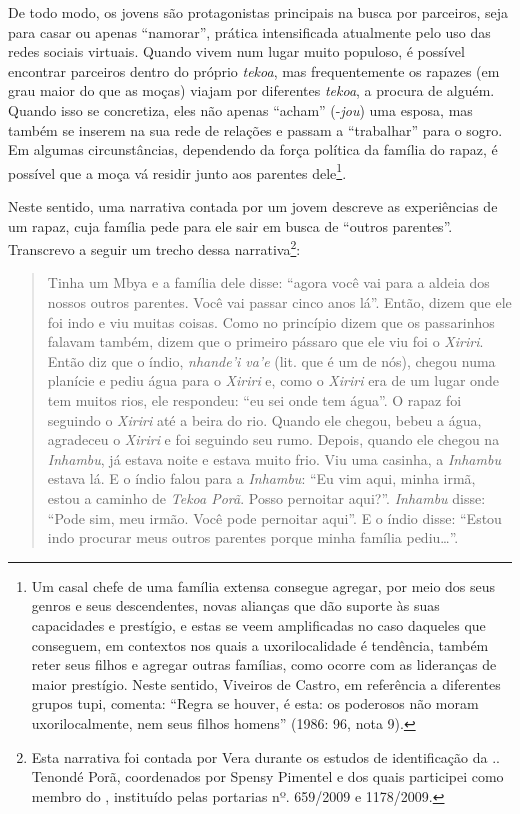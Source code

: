 De todo modo, os jovens são protagonistas principais na busca por
parceiros, seja para casar ou apenas ``namorar'', prática intensificada
atualmente pelo uso das redes sociais virtuais. Quando vivem num lugar
muito populoso, é possível encontrar parceiros dentro do próprio \emph{tekoa},
mas frequentemente os rapazes (em grau maior do que as moças) viajam
por diferentes \emph{tekoa}, a procura de alguém. Quando isso se concretiza,
eles não apenas ``acham'' (-\emph{jou}) uma esposa, mas também se inserem na sua
rede de relações e passam a ``trabalhar'' para o sogro. Em algumas
circunstâncias, dependendo da força política da família do rapaz, é
possível que a moça vá residir junto aos parentes dele\footnote{Um
casal chefe de uma família extensa consegue agregar, por meio dos seus
genros e seus descendentes, novas alianças que dão suporte às suas
capacidades e prestígio, e estas se veem amplificadas no caso daqueles
que conseguem, em contextos nos quais a uxorilocalidade é tendência,
também reter seus filhos e agregar outras famílias, como ocorre com as
lideranças de maior prestígio. Neste sentido, Viveiros de Castro, em
referência a diferentes grupos tupi, comenta: ``Regra se houver, é esta:
os poderosos não moram uxorilocalmente, nem seus filhos homens'' (1986:
96, nota 9).}. 

Neste sentido, uma narrativa contada por um jovem descreve as
experiências de um rapaz, cuja família pede para ele sair em busca de
``outros parentes''. Transcrevo a seguir um trecho dessa
narrativa\footnote{Esta narrativa foi contada por Vera durante os
estudos de identificação da .. Tenondé Porã, coordenados por Spensy
Pimentel e dos quais participei como membro do , instituído pelas
portarias nº. 659/2009 e 1178/2009.}: 

\begin{quotation}
Tinha um Mbya e a família dele disse: ``agora você vai para a aldeia dos
nossos outros parentes. Você vai passar cinco anos lá''. Então, dizem
que ele foi indo e viu muitas coisas. Como no princípio dizem que os
passarinhos falavam também, dizem que o primeiro pássaro que ele viu
foi o \emph{Xiriri}. Então diz que o índio, \emph{nhande’i va’e} (lit. que é um de
nós), chegou numa planície e pediu água para o \emph{Xiriri} e, como o \emph{Xiriri}
era de um lugar onde tem muitos rios, ele respondeu: ``eu sei onde tem
água''. O rapaz foi seguindo o \emph{Xiriri} até a beira do rio. Quando ele
chegou, bebeu a água, agradeceu o \emph{Xiriri} e foi seguindo seu rumo.
Depois, quando ele chegou na \emph{Inhambu}, já estava noite e estava muito
frio. Viu uma casinha, a \emph{Inhambu} estava lá. E o índio falou para a
\emph{Inhambu}: ``Eu vim aqui, minha irmã, estou a caminho de \emph{Tekoa Porã}. Posso
pernoitar aqui?''. \emph{Inhambu} disse: ``Pode sim, meu irmão. Você pode
pernoitar aqui''. E o índio disse: ``Estou indo procurar meus outros
parentes porque minha família pediu\ldots''. 
\end{quotation}

